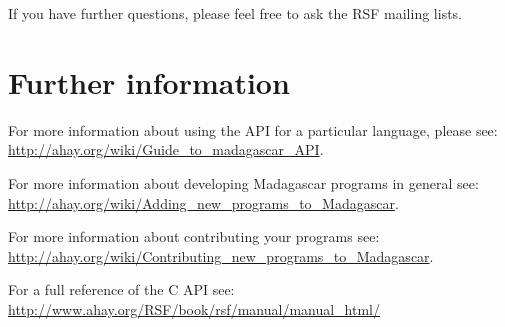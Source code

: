 If you have further questions, please feel free to ask the RSF mailing lists.

\section{Further information}

For more information about using the API for a particular language,
please see:
\url{http://ahay.org/wiki/Guide_to_madagascar_API}.

For more information about developing Madagascar programs in general
see:
\url{http://ahay.org/wiki/Adding_new_programs_to_Madagascar}.

For more information about contributing your programs see:
\url{http://ahay.org/wiki/Contributing_new_programs_to_Madagascar}.

For a full reference of the C API see:
\url{http://www.ahay.org/RSF/book/rsf/manual/manual_html/}
